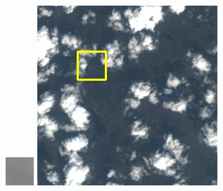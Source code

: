 \documentclass[10pt]{ctexart}
\begin{document}
\begin{figure}[H]
{{\begin{minipage}[b]{0.15\linewidth}
            \includegraphics[width=1\linewidth]{../log/spoon2/cut/tmp_cut_LC81321192014054LGN00_03055_color.jpg}\vspace{4pt}
            \includegraphics[width=1\linewidth]{../log/spoon2/cut/LC80350192014190LGN00_06561_color.jpg}\vspace{4pt}

\end{minipage}}}
\end{figure}
\end{document}
